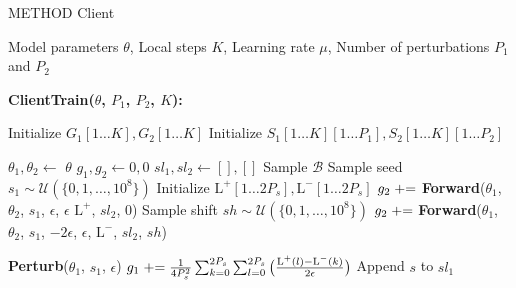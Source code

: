 \begin{algorithm}[]

\caption{\ac{METHOD} Client}
\begin{algorithmic}[1] 
\REQUIRE Model parameters $\theta$, Local steps $K$, Learning rate $\mu$, Number of perturbations $P_{1}$ and $P_{2}$ 

\STATE \textbf{ClientTrain($\theta$, $P_{1}$, $P_{2}$, $K$):}
    
\STATE Initialize $G_{1}[1 \dots K], G_{2}[1 \dots K]$
\STATE Initialize $S_{1}[1 \dots K][1 \dots P_{1}], S_{2}[1 \dots K][1 \dots P_{2}]$

\STATE $\theta_{1}, \theta_{2} \gets$  $\theta$
\STATE $g_{1}, g_{2} \gets 0, 0$
\STATE $sl_{1}, sl_{2}  \gets [], []$
\STATE Sample $\mathcal{B}$
\STATE {}
    \STATE Sample seed $s_{1} \sim \mathcal{U}(\{0, 1, \dots, 10^{8}\})$
    \STATE Initialize $\text{L}^{+}[1 \dots  2 P_{s}], \text{L}^{-}[1 \dots 2 P_{s}]$
    \STATE $g_{2} \mathrel{+}=$ \textbf{Forward}($\theta_{1}$, $\theta_{2}$, $s_{1}$, $\epsilon$, $\epsilon$ $\text{L}^{+}$, $sl_{2}$, 0)
    \STATE Sample shift $sh \sim \mathcal{U}(\{0, 1, \dots, 10^{8}\})$
    \STATE $g_{2} \mathrel{+}=$ \textbf{Forward}($\theta_{1}$, $\theta_{2}$, $s_{1}$, $-2\epsilon$, $\epsilon$, $\text{L}^{-}$, $sl_{2}$, $sh$)
    
    
    \STATE \textbf{Perturb}($\theta_{1}$, $s_{1}$, $\epsilon$) 
    \STATE $g_{1} \mathrel{+}= \frac{1}{4 P_{s}^{2}} \sum_{k=0}^{2P_{s}} \sum_{l=0}^{2P_{s}} \big( \frac{\text{L}^{+} (l) - \text{L}^{-} (k)} {2\epsilon} \big)$ %
    \STATE Append $s$ to $sl_{1}$
    

\end{algorithmic}
\end{algorithm}
